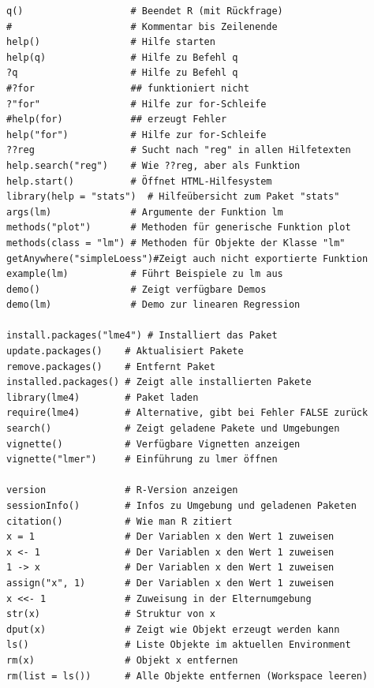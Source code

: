 \documentclass[10pt,twocolumn]{scrartcl}
\begin{document}
    
\fi












\iffalse

\begin{lstlisting}
q()                   # Beendet R (mit Rückfrage)
#                     # Kommentar bis Zeilenende
help()                # Hilfe starten
help(q)               # Hilfe zu Befehl q
?q                    # Hilfe zu Befehl q
#?for                 ## funktioniert nicht
?"for"                # Hilfe zur for-Schleife
#help(for)            ## erzeugt Fehler
help("for")           # Hilfe zur for-Schleife
??reg                 # Sucht nach "reg" in allen Hilfetexten
help.search("reg")    # Wie ??reg, aber als Funktion
help.start()          # Öffnet HTML-Hilfesystem
library(help = "stats")  # Hilfeübersicht zum Paket "stats"
args(lm)              # Argumente der Funktion lm
methods("plot")       # Methoden für generische Funktion plot
methods(class = "lm") # Methoden für Objekte der Klasse "lm"
getAnywhere("simpleLoess")#Zeigt auch nicht exportierte Funktion
example(lm)           # Führt Beispiele zu lm aus
demo()                # Zeigt verfügbare Demos
demo(lm)              # Demo zur linearen Regression

install.packages("lme4") # Installiert das Paket
update.packages()    # Aktualisiert Pakete
remove.packages()    # Entfernt Paket
installed.packages() # Zeigt alle installierten Pakete
library(lme4)        # Paket laden
require(lme4)        # Alternative, gibt bei Fehler FALSE zurück
search()             # Zeigt geladene Pakete und Umgebungen
vignette()           # Verfügbare Vignetten anzeigen
vignette("lmer")     # Einführung zu lmer öffnen

version              # R-Version anzeigen
sessionInfo()        # Infos zu Umgebung und geladenen Paketen
citation()           # Wie man R zitiert
x = 1                # Der Variablen x den Wert 1 zuweisen
x <- 1               # Der Variablen x den Wert 1 zuweisen
1 -> x               # Der Variablen x den Wert 1 zuweisen
assign("x", 1)       # Der Variablen x den Wert 1 zuweisen
x <<- 1              # Zuweisung in der Elternumgebung
str(x)               # Struktur von x
dput(x)              # Zeigt wie Objekt erzeugt werden kann
ls()                 # Liste Objekte im aktuellen Environment
rm(x)                # Objekt x entfernen
rm(list = ls())      # Alle Objekte entfernen (Workspace leeren)


\end{lstlisting}
\end{document}
